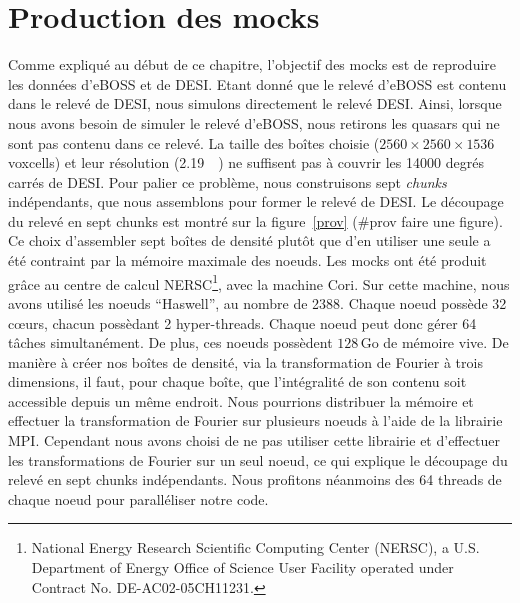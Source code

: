 \documentclass[11pt, twoside, a4paper, openright]{report}
\begin{document}
\section{Production des mocks}
Comme expliqué au début de ce chapitre, l'objectif des mocks est de reproduire les données d'eBOSS et de DESI. Etant donné que le relevé d'eBOSS est contenu dans le relevé de DESI, nous simulons directement le relevé DESI. Ainsi, lorsque nous avons besoin de simuler le relevé d'eBOSS, nous retirons les quasars qui ne sont pas contenu dans ce relevé. La taille des boîtes choisie ($\num{2560}\times\num{2560}\times\num{1536}$ voxcells) et leur résolution (\SI{2.19}{\perh\Mpc}) ne suffisent pas à couvrir les \num{14000} degrés carrés de DESI. Pour palier ce problème, nous construisons sept \emph{chunks} indépendants, que nous assemblons pour former le relevé de DESI. Le découpage du relevé en sept chunks est montré sur la figure~\ref{prov} (\#prov faire une figure). Ce choix d'assembler sept boîtes de densité plutôt que d'en utiliser une seule a été contraint par la mémoire maximale des noeuds. Les mocks ont été produit grâce au centre de calcul NERSC\footnote{National Energy Research Scientific Computing Center (NERSC), a U.S. Department of Energy Office of Science User Facility operated under Contract No. DE-AC02-05CH11231.}, avec la machine Cori. Sur cette machine, nous avons utilisé les noeuds ``Haswell'', au nombre de \num{2388}. Chaque noeud possède 32 c{\oe}urs, chacun possèdant 2 hyper-threads. Chaque noeud peut donc gérer 64 tâches simultanément. De plus, ces noeuds possèdent $\num{128}\,\mathrm{Go}$ de mémoire vive. De manière à créer nos boîtes de densité, via la transformation de Fourier à trois dimensions, il faut, pour chaque boîte, que l'intégralité de son contenu soit accessible depuis un même endroit. Nous pourrions distribuer la mémoire et effectuer la transformation de Fourier sur plusieurs noeuds à l'aide de la librairie MPI. Cependant nous avons choisi de ne pas utiliser cette librairie et d'effectuer les transformations de Fourier sur un seul noeud, ce qui explique le découpage du relevé en sept chunks indépendants. Nous profitons néanmoins des 64 threads de chaque noeud pour paralléliser notre code.
\end{document}
